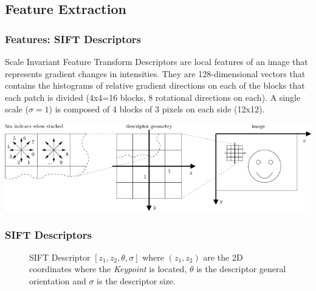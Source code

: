 \documentclass[11pt]{beamer}
\begin{document}
    \subsection{Feature Extraction}
    \begin{frame}
    \frametitle{Features: SIFT Descriptors}
    
    Scale Invariant Feature Transform Descriptors are local features of an image that represents gradient changes in intensities.  They are 128-dimensional vectors that contains the histograms of relative gradient directions on each of the blocks that each patch is divided (4x4=16 blocks, 8 rotational directions on each).  A single scale ($ \sigma = 1 $) is composed of 4 blocks of 3 pixels on each side (12x12).
    
        \includegraphics[scale=0.5]{img/sift-conv-vlfeat.png}     
    \end{frame}
    
    \begin{frame}
        \frametitle{SIFT Descriptors}
        \begin{center}
   			\begin{figure}[thpb]
      			\centering
      			\setlength\fboxsep{0pt}
	  			\setlength\fboxrule{0.5pt}
      			\caption{\centering SIFT Descriptor $ [ z_1, z_2, \theta, \sigma ] $ where $ (z_1, z_2) $ are the 2D coordinates where the \textit{Keypoint} is located, $ \theta $ is the descriptor general orientation and $ \sigma $ is the descriptor size. }
      			\label{figure1}
   			\end{figure}        
        \end{center}
    \end{frame}   
    
\end{document}
